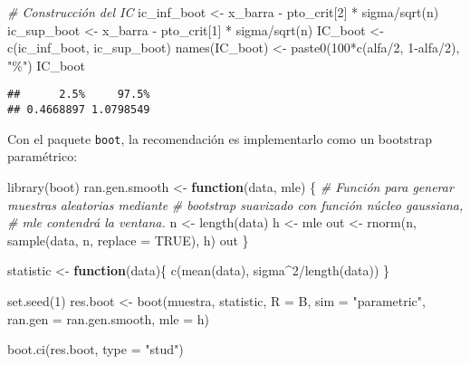 \documentclass[
]{book}
\newenvironment{Shaded}{\begin{snugshade}}{\end{snugshade}}
\newcommand{\AttributeTok}[1]{\textcolor[rgb]{0.77,0.63,0.00}{#1}}
\newcommand{\CommentTok}[1]{\textcolor[rgb]{0.56,0.35,0.01}{\textit{#1}}}
\newcommand{\ConstantTok}[1]{\textcolor[rgb]{0.00,0.00,0.00}{#1}}
\newcommand{\ControlFlowTok}[1]{\textcolor[rgb]{0.13,0.29,0.53}{\textbf{#1}}}
\newcommand{\DecValTok}[1]{\textcolor[rgb]{0.00,0.00,0.81}{#1}}
\newcommand{\FunctionTok}[1]{\textcolor[rgb]{0.00,0.00,0.00}{#1}}
\newcommand{\NormalTok}[1]{#1}
\newcommand{\OtherTok}[1]{\textcolor[rgb]{0.56,0.35,0.01}{#1}}
\newcommand{\SpecialCharTok}[1]{\textcolor[rgb]{0.00,0.00,0.00}{#1}}
\newcommand{\StringTok}[1]{\textcolor[rgb]{0.31,0.60,0.02}{#1}}
\theoremstyle{break}
\theoremstyle{definition}
\theoremstyle{definition}
\theoremstyle{definition}
\theoremstyle{definition}
\theoremstyle{remark}
\begin{document}
\begin{Shaded}
\begin{Highlighting}[]
\CommentTok{\# Construcción del IC}
\NormalTok{ic\_inf\_boot }\OtherTok{\textless{}{-}}\NormalTok{ x\_barra }\SpecialCharTok{{-}}\NormalTok{ pto\_crit[}\DecValTok{2}\NormalTok{] }\SpecialCharTok{*}\NormalTok{ sigma}\SpecialCharTok{/}\FunctionTok{sqrt}\NormalTok{(n)}
\NormalTok{ic\_sup\_boot }\OtherTok{\textless{}{-}}\NormalTok{ x\_barra }\SpecialCharTok{{-}}\NormalTok{ pto\_crit[}\DecValTok{1}\NormalTok{] }\SpecialCharTok{*}\NormalTok{ sigma}\SpecialCharTok{/}\FunctionTok{sqrt}\NormalTok{(n)}
\NormalTok{IC\_boot }\OtherTok{\textless{}{-}} \FunctionTok{c}\NormalTok{(ic\_inf\_boot, ic\_sup\_boot)}
\FunctionTok{names}\NormalTok{(IC\_boot) }\OtherTok{\textless{}{-}} \FunctionTok{paste0}\NormalTok{(}\DecValTok{100}\SpecialCharTok{*}\FunctionTok{c}\NormalTok{(alfa}\SpecialCharTok{/}\DecValTok{2}\NormalTok{, }\DecValTok{1}\SpecialCharTok{{-}}\NormalTok{alfa}\SpecialCharTok{/}\DecValTok{2}\NormalTok{), }\StringTok{"\%"}\NormalTok{)}
\NormalTok{IC\_boot}
\end{Highlighting}
\end{Shaded}

\begin{verbatim}
##      2.5%     97.5% 
## 0.4668897 1.0798549
\end{verbatim}

Con el paquete \texttt{boot}, la recomendación es implementarlo como
un bootstrap paramétrico:

\begin{Shaded}
\begin{Highlighting}[]
\FunctionTok{library}\NormalTok{(boot)}
\NormalTok{ran.gen.smooth }\OtherTok{\textless{}{-}} \ControlFlowTok{function}\NormalTok{(data, mle) \{}
    \CommentTok{\# Función para generar muestras aleatorias mediante }
    \CommentTok{\# bootstrap suavizado con función núcleo gaussiana,}
    \CommentTok{\# mle contendrá la ventana.}
\NormalTok{    n }\OtherTok{\textless{}{-}} \FunctionTok{length}\NormalTok{(data)}
\NormalTok{    h }\OtherTok{\textless{}{-}}\NormalTok{ mle}
\NormalTok{    out }\OtherTok{\textless{}{-}} \FunctionTok{rnorm}\NormalTok{(n, }\FunctionTok{sample}\NormalTok{(data, n, }\AttributeTok{replace =} \ConstantTok{TRUE}\NormalTok{), h)}
\NormalTok{    out}
\NormalTok{\}}

\NormalTok{statistic }\OtherTok{\textless{}{-}} \ControlFlowTok{function}\NormalTok{(data)\{}
    \FunctionTok{c}\NormalTok{(}\FunctionTok{mean}\NormalTok{(data), sigma}\SpecialCharTok{\^{}}\DecValTok{2}\SpecialCharTok{/}\FunctionTok{length}\NormalTok{(data))}
\NormalTok{\}}

\FunctionTok{set.seed}\NormalTok{(}\DecValTok{1}\NormalTok{)}
\NormalTok{res.boot }\OtherTok{\textless{}{-}} \FunctionTok{boot}\NormalTok{(muestra, statistic, }\AttributeTok{R =}\NormalTok{ B, }\AttributeTok{sim =} \StringTok{"parametric"}\NormalTok{,}
                 \AttributeTok{ran.gen =}\NormalTok{ ran.gen.smooth, }\AttributeTok{mle =}\NormalTok{ h)}

\FunctionTok{boot.ci}\NormalTok{(res.boot, }\AttributeTok{type =} \StringTok{"stud"}\NormalTok{)}
\end{Highlighting}
\end{Shaded}
\end{document}
